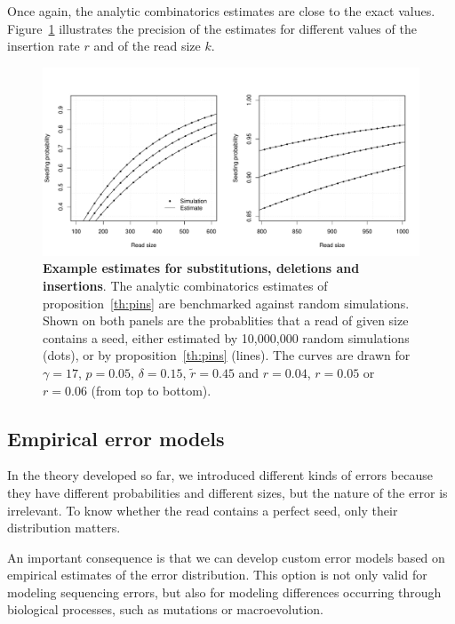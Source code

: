 \documentclass{article}
\begin{document}
Once again, the analytic combinatorics estimates are close to the exact
values. Figure~\ref{fig:simulpins} illustrates the precision of the
estimates for different values of the insertion rate $r$ and of the read
size $k$.

\begin{figure}[h]
\centering
\includegraphics[scale=0.445]{simulpins.pdf}
\caption{\textbf{Example estimates for substitutions, deletions and
insertions}. The analytic combinatorics estimates of
proposition~\ref{th:pins} are benchmarked against random simulations.
Shown on both panels are the probablities that a read of given size
contains a seed, either estimated by 10,000,000 random simulations (dots),
or by proposition~\ref{th:pins} (lines). The curves are drawn for
$\gamma=17$, $p=0.05$, $\delta=0.15$, $\tilde{r} = 0.45$ and $r=0.04$,
$r=0.05$ or $r=0.06$ (from top to bottom).}
\label{fig:simulpins}
\end{figure}





\subsection{Empirical error models}
\label{subsec:empirical}

In the theory developed so far, we introduced different kinds of errors
because they have different probabilities and different sizes, but the
nature of the error is irrelevant. To know whether the read contains a
perfect seed, only their distribution matters.

An important consequence is that we can develop custom error models based
on empirical estimates of the error distribution. This option is not only
valid for modeling sequencing errors, but also for modeling differences
occurring through biological processes, such as mutations or
macroevolution.
\end{document}
